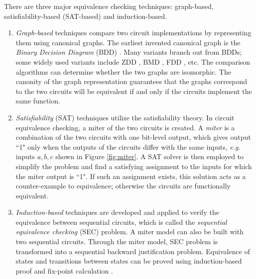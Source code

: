 There are three major
equivalence checking techniques: graph-based,
satisfiability-based (SAT-based) and induction-based.
\begin{enumerate}[{1)}]
\item \emph{Graph-based} techniques compare two circuit implementations 
by representing them using canonical graphs. 
The earliest invented canonical graph is the \emph{Binary Decision Diagram} (BDD) \cite{BRYA86}.
Many variants branch out from BDDs; some widely used variants include 
ZDD \cite{minato1993zero}, BMD \cite{bmd}, FDD \cite{okfdd}, etc. The comparison algorithms can 
determine whether the two graphs are isomorphic. The canonity of the graph representation guarantees that
the graphs correspond to the two circuits will be 
equivalent if and only if the circuits implement the same function.
\item \emph{Satisfiability} (SAT) techniques utilize the satisfiability theory.
In circuit equivalence checking, a miter of the two circuits is created.
A \emph{miter} is a combination of the two circuits with one bit-level output, which 
gives output ``1" only when the outputs of the circuits differ with 
the same inputs, {\it e.g. }inputs $a,b,c$ shown in Figure \ref{fig:miter}. 
A SAT solver \cite{csat,mishchenko2006improvements} is then employed to simplify the problem 
and find a satisfying assignment to the inputs for which the 
miter output is ``1". If such an assignment exists, this solution acts as a 
counter-example to equivalence; otherwise the circuits
are functionally equivalent.
\item \emph{Induction-based} techniques are developed and applied to verify the 
equivalence between sequential circuits, which is called the {\it sequential equivalence checking}
(SEC) problem. A miter model can also be built with two sequential circuits. Through the 
miter model, SEC problem is transformed into a sequential backward justification problem.
Equivalence of states and transitions between states can be proved using induction-based 
proof and fix-point calculation \cite{bjesse2000sat,stoffel1997record}.
\end{enumerate}


\begin{figure}[h]
\end{figure}

